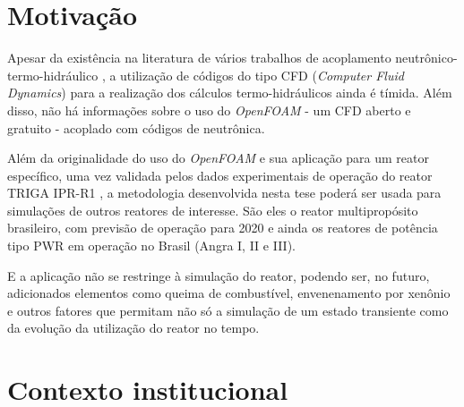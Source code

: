 \documentclass[12pt,openright,twoside,a4paper,english,french,spanish,brazil]{abntex2}
\begin{document}

\tableofcontents*
\cleardoublepage



\textual




\section*{Motivação}

Apesar da existência na literatura de vários trabalhos de acoplamento neutrônico-termo-hidráulico \cite{Faghihi2011}, 
a utilização de códigos do tipo CFD (\textit{Computer Fluid Dynamics}) para a realização dos cálculos 
termo-hidráulicos ainda é tímida. Além disso, não há informações sobre o uso do \textit{OpenFOAM} - 
um CFD aberto e gratuito \cite{Jasak2007} - acoplado com códigos de neutrônica. 

Além da originalidade do uso do 
\textit{OpenFOAM} e sua aplicação para um reator específico, uma vez validada pelos dados experimentais 
de operação do reator TRIGA IPR-R1 \cite{Mesquita2006}, a metodologia desenvolvida nesta tese poderá ser usada para simulações de 
outros reatores de interesse. São eles o reator multipropósito brasileiro, com previsão de operação para 2020 e 
ainda os reatores de potência tipo PWR em operação no Brasil (Angra I, II e III). 

E a aplicação não se restringe à simulação do reator, podendo ser, no futuro, adicionados elementos como queima 
de combustível, envenenamento por xenônio e outros fatores que permitam não só a simulação de um estado 
transiente como da evolução da utilização do reator no tempo.


\section*{Contexto institucional}
\end{document}
